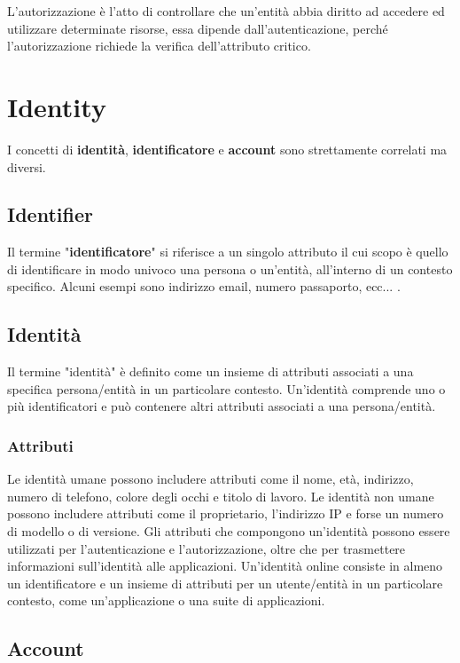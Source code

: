 L'autorizzazione è l'atto di controllare che un'entità abbia diritto ad
accedere ed utilizzare determinate risorse, essa
dipende dall'autenticazione, perché l'autorizzazione richiede
la verifica dell'attributo critico.

\section{Identity}

I concetti di \textbf{identità}, \textbf{identificatore} e \textbf{account} sono
strettamente correlati ma diversi.

\subsection{Identifier}

Il termine "\textbf{identificatore}" si riferisce a un singolo attributo il cui scopo
è quello di identificare in modo univoco una persona o un'entità,
all'interno di un contesto specifico. Alcuni esempi sono
indirizzo email, numero passaporto, ecc... .

\subsection{Identità}

Il termine "identità" è definito come un insieme di attributi associati a una
specifica persona/entità in un particolare contesto. Un'identità comprende uno o
più identificatori e può contenere altri attributi associati a una persona/entità.

\subsubsection{Attributi}

Le identità umane possono includere attributi come il nome, età, indirizzo,
numero di telefono, colore degli occhi e titolo di lavoro.
Le identità non umane possono includere attributi come il proprietario,
l'indirizzo IP e forse un numero di modello o di versione.
Gli attributi che compongono un'identità possono essere utilizzati per
l'autenticazione e l'autorizzazione, oltre che per trasmettere informazioni
sull'identità alle applicazioni.
Un'identità online consiste in almeno un identificatore e un insieme di attributi
per un utente/entità in un particolare contesto, come un'applicazione o una suite di
applicazioni.

\subsection{Account}

